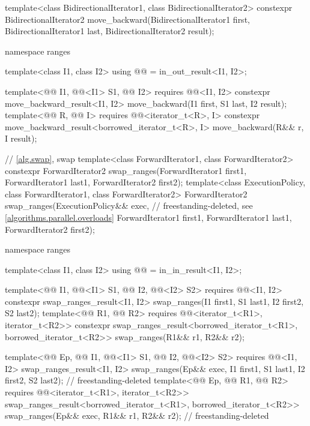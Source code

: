 \begin{codeblock}
{  template<class BidirectionalIterator1, class BidirectionalIterator2>
    constexpr BidirectionalIterator2
      move_backward(BidirectionalIterator1 first, BidirectionalIterator1 last,
                    BidirectionalIterator2 result);

  namespace ranges {
    template<class I1, class I2>
      using @@ = in_out_result<I1, I2>;

    template<@@ I1, @@<I1> S1, @@ I2>
      requires @@<I1, I2>
      constexpr move_backward_result<I1, I2>
        move_backward(I1 first, S1 last, I2 result);
    template<@@ R, @@ I>
      requires @@<iterator_t<R>, I>
      constexpr move_backward_result<borrowed_iterator_t<R>, I>
        move_backward(R&& r, I result);
  }

  // \ref{alg.swap}, swap
  template<class ForwardIterator1, class ForwardIterator2>
    constexpr ForwardIterator2 swap_ranges(ForwardIterator1 first1, ForwardIterator1 last1,
                                           ForwardIterator2 first2);
  template<class ExecutionPolicy, class ForwardIterator1, class ForwardIterator2>
    ForwardIterator2 swap_ranges(ExecutionPolicy&& exec,        // freestanding-deleted, see \ref{algorithms.parallel.overloads}
                                 ForwardIterator1 first1, ForwardIterator1 last1,
                                 ForwardIterator2 first2);

  namespace ranges {
    template<class I1, class I2>
      using @@ = in_in_result<I1, I2>;

    template<@@ I1, @@<I1> S1, @@ I2, @@<I2> S2>
      requires @@<I1, I2>
      constexpr swap_ranges_result<I1, I2>
        swap_ranges(I1 first1, S1 last1, I2 first2, S2 last2);
    template<@@ R1, @@ R2>
      requires @@<iterator_t<R1>, iterator_t<R2>>
      constexpr swap_ranges_result<borrowed_iterator_t<R1>, borrowed_iterator_t<R2>>
        swap_ranges(R1&& r1, R2&& r2);

    template<@@ Ep, @@ I1, @@<I1> S1,
             @@ I2, @@<I2> S2>
      requires @@<I1, I2>
      swap_ranges_result<I1, I2>
        swap_ranges(Ep&& exec, I1 first1, S1 last1, I2 first2, S2 last2);   // freestanding-deleted
    template<@@ Ep, @@ R1, @@ R2>
      requires @@<iterator_t<R1>, iterator_t<R2>>
      swap_ranges_result<borrowed_iterator_t<R1>, borrowed_iterator_t<R2>>
        swap_ranges(Ep&& exec, R1&& r1, R2&& r2);                           // freestanding-deleted
  }

}
\end{codeblock}
